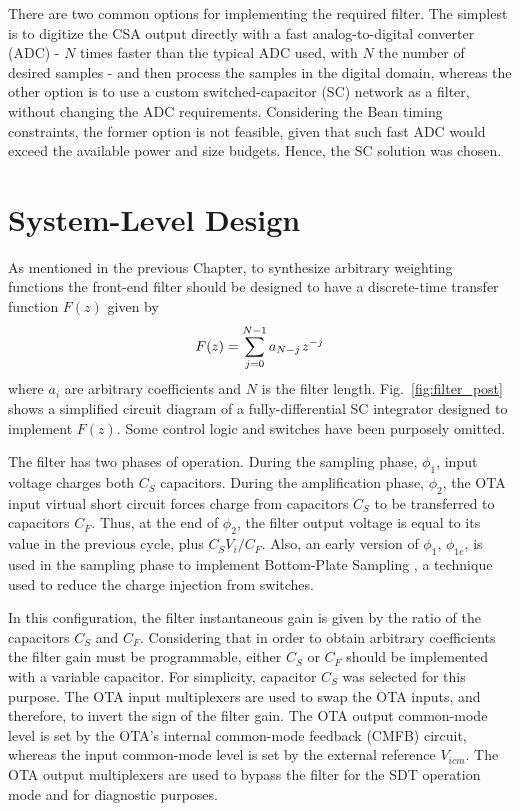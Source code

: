 There are two common options for implementing the required filter. The simplest is to digitize the CSA output directly with a fast analog-to-digital converter (ADC)  - $N$ times faster than the typical ADC used, with $N$ the number of desired samples - and then process the samples in the digital domain, whereas the other option is to use a custom \mbox{switched-capacitor} (SC) network as a filter, without changing the ADC requirements. Considering the Bean timing constraints, the former option is not feasible, given that such fast ADC would exceed the available power and size budgets. Hence, the SC solution was chosen.


\section{System-Level Design}
As mentioned in the previous Chapter, to synthesize arbitrary weighting functions the front-end filter should be designed to have a  discrete-time transfer function $F(z)$ given by
\begin{equation}
F(z) = \sum_{j=0}^{N-1}a_{N-j} \hspace{0.1em}z^{-j} \label{eq:filter_tf}
\end{equation}
where $a_i$ are arbitrary coefficients and $N$ is the filter length. Fig.~\ref{fig:filter_post} shows a simplified circuit diagram of a fully-differential SC integrator designed to implement $F(z)$. Some control logic and switches have been purposely omitted.

The filter has two phases of operation. During the sampling phase, $\phi_1$, input voltage charges  both $C_S$ capacitors. During the amplification phase, $\phi_2$, the OTA input virtual short circuit forces charge from capacitors $C_S$ to be transferred to capacitors $C_F$. Thus, at the end of $\phi_2$, the filter output voltage is equal to its value in the previous cycle, plus $C_S V_i/C_F$. Also, an early version of $\phi_1$, $\phi_{1e}$, is used in the sampling phase to implement Bottom-Plate Sampling \citep{haigh101}, a technique used to reduce the charge injection from switches.

In this configuration, the filter instantaneous gain is given by the ratio of the capacitors $C_S$ and $C_F$.  Considering that in order to obtain arbitrary coefficients the filter gain must be programmable, either $C_S$ or $C_F$ should be implemented with a variable capacitor. For simplicity, capacitor $C_S$ was selected for this purpose. The OTA input multiplexers are used to swap the OTA inputs, and therefore, to invert the sign of the filter gain. The OTA output common-mode level is set by the OTA's internal common-mode feedback (CMFB) circuit, whereas the input common-mode level is set by the external reference $V_\textit{icm}$. The OTA output multiplexers are used to bypass the filter for the SDT operation mode and for diagnostic purposes.


